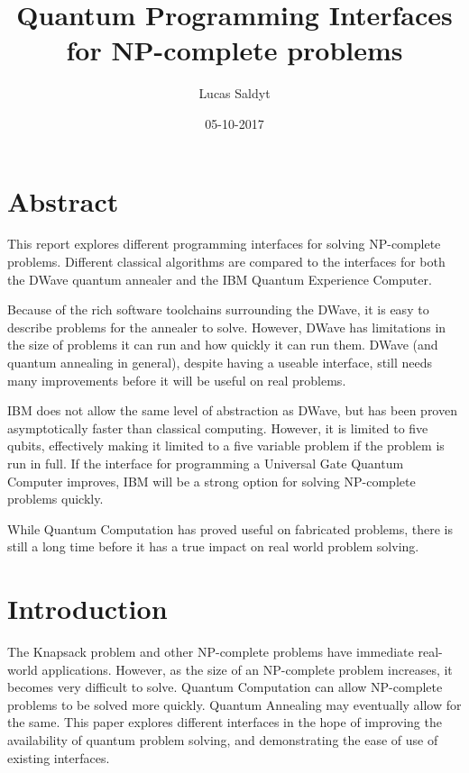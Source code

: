 \documentclass{article}
\title{Quantum Programming Interfaces for NP-complete problems}
\date{05-10-2017}
\author{Lucas Saldyt}
\begin{document}
\maketitle
{}
\newpage
\tableofcontents
\newpage
{}

\section{Abstract}

This report explores different programming interfaces for solving NP-complete problems.
Different classical algorithms are compared to the interfaces for both the DWave quantum annealer and the IBM Quantum Experience Computer.

Because of the rich software toolchains surrounding the DWave, it is easy to describe problems for the annealer to solve.
However, DWave has limitations in the size of problems it can run and how quickly it can run them.
DWave (and quantum annealing in general), despite having a useable interface, still needs many improvements before it will be useful on real problems.

IBM does not allow the same level of abstraction as DWave, but has been proven asymptotically faster than classical computing.
However, it is limited to five qubits, effectively making it limited to a five variable problem if the problem is run in full.
If the interface for programming a Universal Gate Quantum Computer improves, IBM will be a strong option for solving NP-complete problems quickly.

While Quantum Computation has proved useful on fabricated problems, there is still a long time before it has a true impact on real world problem solving.

\section{Introduction}

The Knapsack problem and other NP-complete problems have immediate real-world applications. 
However, as the size of an NP-complete problem increases, it becomes very difficult to solve.
Quantum Computation can allow NP-complete problems to be solved more quickly.
Quantum Annealing may eventually allow for the same.
This paper explores different interfaces in the hope of improving the availability of quantum problem solving, and demonstrating the ease of use of existing interfaces.
\end{document}
